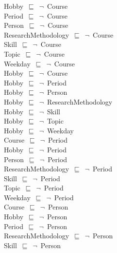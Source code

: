 \documentclass{article}
\begin{document}
Hobby~\ensuremath{\sqsubseteq}~\ensuremath{\lnot}~Course\\
Period~\ensuremath{\sqsubseteq}~\ensuremath{\lnot}~Course\\
Person~\ensuremath{\sqsubseteq}~\ensuremath{\lnot}~Course\\
ResearchMethodology~\ensuremath{\sqsubseteq}~\ensuremath{\lnot}~Course\\
Skill~\ensuremath{\sqsubseteq}~\ensuremath{\lnot}~Course\\
Topic~\ensuremath{\sqsubseteq}~\ensuremath{\lnot}~Course\\
Weekday~\ensuremath{\sqsubseteq}~\ensuremath{\lnot}~Course\\
Hobby~\ensuremath{\sqsubseteq}~\ensuremath{\lnot}~Course\\
Hobby~\ensuremath{\sqsubseteq}~\ensuremath{\lnot}~Period\\
Hobby~\ensuremath{\sqsubseteq}~\ensuremath{\lnot}~Person\\
Hobby~\ensuremath{\sqsubseteq}~\ensuremath{\lnot}~ResearchMethodology\\
Hobby~\ensuremath{\sqsubseteq}~\ensuremath{\lnot}~Skill\\
Hobby~\ensuremath{\sqsubseteq}~\ensuremath{\lnot}~Topic\\
Hobby~\ensuremath{\sqsubseteq}~\ensuremath{\lnot}~Weekday\\
Course~\ensuremath{\sqsubseteq}~\ensuremath{\lnot}~Period\\
Hobby~\ensuremath{\sqsubseteq}~\ensuremath{\lnot}~Period\\
Person~\ensuremath{\sqsubseteq}~\ensuremath{\lnot}~Period\\
ResearchMethodology~\ensuremath{\sqsubseteq}~\ensuremath{\lnot}~Period\\
Skill~\ensuremath{\sqsubseteq}~\ensuremath{\lnot}~Period\\
Topic~\ensuremath{\sqsubseteq}~\ensuremath{\lnot}~Period\\
Weekday~\ensuremath{\sqsubseteq}~\ensuremath{\lnot}~Period\\
Course~\ensuremath{\sqsubseteq}~\ensuremath{\lnot}~Person\\
Hobby~\ensuremath{\sqsubseteq}~\ensuremath{\lnot}~Person\\
Period~\ensuremath{\sqsubseteq}~\ensuremath{\lnot}~Person\\
ResearchMethodology~\ensuremath{\sqsubseteq}~\ensuremath{\lnot}~Person\\
Skill~\ensuremath{\sqsubseteq}~\ensuremath{\lnot}~Person\\
\end{document}
